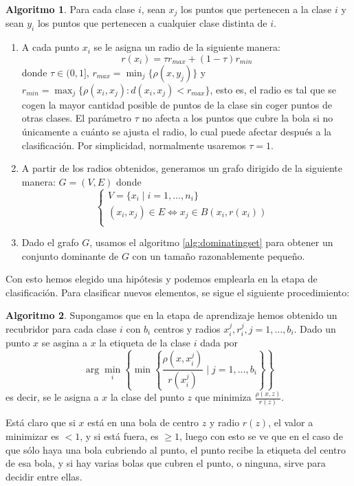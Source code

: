 \documentclass[a4paper,12pt]{report}
\theoremstyle{definition}
\newtheorem{alg}{Algoritmo}
\begin{document}
\begin{alg}
  \label{alg:pcccd}
  Para cada clase $i$, sean $x_j$ los puntos que pertenecen a la clase $i$ y sean $y_i$ los puntos que pertenecen a cualquier clase distinta de $i$.
  \begin{enumerate}
  \item A cada punto $x_i$ se le asigna un radio de la siguiente manera:
    $$r(x_i) = \tau r_{max} + (1- \tau)r_{min}$$
    donde $\tau \in \lparen 0,1\rbrack$, $r_{max} = \min_j \lbrace \rho(x, y_j) \rbrace $ y $r_{min} = \max_j \{ \rho(x_i,x_j) : d(x_i,x_j) < r_{max} \} $, esto es, el radio es tal que se cogen la mayor cantidad posible de puntos de la clase sin coger puntos de otras clases. El parámetro $\tau$ no afecta a los puntos que cubre la bola si no únicamente a cuánto se ajusta el radio, lo cual puede afectar después a la clasificación. Por simplicidad, normalmente usaremos $\tau = 1$.
  \item A partir de los radios obtenidos, generamos un grafo dirigido de la siguiente manera: $G = (V,E)$ donde
    \[
    \begin{cases}
      V = \lbrace x_i \mid i = 1, \ldots, n_i \rbrace &\\
      (x_i, x_j) \in E \Leftrightarrow x_j \in B(x_i, r(x_i)) &\\
    \end{cases}
    \]
  \item Dado el grafo $G$, usamos el algoritmo \ref{alg:dominatingset} para obtener un conjunto dominante de $G$ con un tamaño razonablemente pequeño.
  \end{enumerate}
\end{alg}

Con esto hemos elegido una hipótesis y podemos emplearla en la etapa de clasificación. Para clasificar nuevos elementos, se sigue el siguiente procedimiento:

\begin{alg}
  Supongamos que en la etapa de aprendizaje hemos obtenido un recubridor para cada clase $i$ con $b_i$ centros y radios $x_i^j, r_i^j, j = 1, \ldots, b_i$.
  Dado un punto $x$ se asgina a $x$ la etiqueta de la clase $i$ dada por
  $$ \arg \min_i \left \lbrace \min \left\lbrace\frac{\rho(x, x_i^j)}{r(x_i^j)} \mid j = 1, \ldots, b_i\right\rbrace \right\rbrace$$
  es decir, se le asigna a $x$ la clase del punto $z$ que minimiza $\frac{\rho(x,z)}{r(z)}$.

  Está claro que si $x$ está en una bola de centro $z$ y radio $r(z)$, el valor a minimizar es $<1$, y si está fuera, es $\geq 1$, luego con esto se ve que en el caso de que sólo haya una bola cubriendo al punto, el punto recibe la etiqueta del centro de esa bola, y si hay varias bolas que cubren el punto, o ninguna, sirve para decidir entre ellas.

\end{alg}
\end{document}
